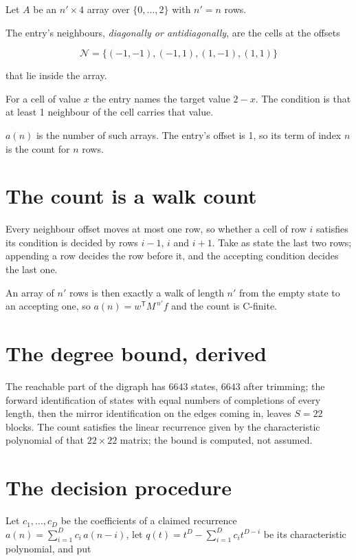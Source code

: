 \documentclass[11pt]{article}
\theoremstyle{definition}
\begin{document}
Let $A$ be an $n' \times 4$ array over $\{0,\dots,2\}$ with $n' = n$ rows.

The entry's neighbours, {\itshape diagonally or antidiagonally}, are the cells at the offsets

\[\mathcal{N} = \{(-1,-1), (-1,1), (1,-1), (1,1)\}\]

that lie inside the array.

For a cell of value $x$ the entry names the target value $2 - x$. The condition is that at least 1 neighbour of the cell carries that value.

$a(n)$ is the number of such arrays. The entry's offset is 1, so its term of index $n$ is the count for $n$ rows.

\section{The count is a walk count}

Every neighbour offset moves at most one row, so whether a cell of row $i$ satisfies its condition is decided by rows $i-1$, $i$ and $i+1$. Take as state the last two rows; appending a row decides the row before it, and the accepting condition decides the last one.

An array of $n'$ rows is then exactly a walk of length $n'$ from the empty state to an accepting one, so $a(n) = w^{\mathsf T}M^{\,n'}f$ and the count is C-finite.

\section{The degree bound, derived}

The reachable part of the digraph has $6643$ states, $6643$ after trimming; the forward identification of states with equal numbers of completions of every length, then the mirror identification on the edges coming in, leaves $S = 22$ blocks. The count satisfies the linear recurrence given by the characteristic polynomial of that $22\times22$ matrix; the bound is computed, not assumed.

\section{The decision procedure}

Let $c_1,\dots,c_D$ be the coefficients of a claimed recurrence $a(n) = \sum_{i=1}^{D} c_i\,a(n-i)$, let $q(t) = t^{D} - \sum_{i=1}^{D} c_i t^{D-i}$ be its characteristic polynomial, and put
\end{document}
